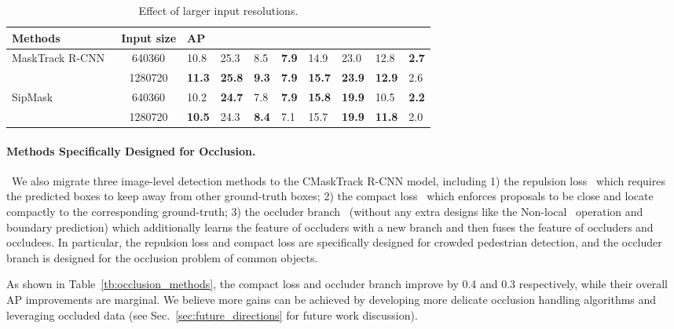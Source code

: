 \documentclass[twocolumn]{svjour3}          \smartqed  \usepackage{graphicx}
\def\myTextColor{\textcolor[rgb]{0, 0, 0}}
\begin{document}
\begin{sloppypar}
\begin{table*}
\centering
\begin{tabular}{|l|c|p{0.48cm}<{\centering}p{0.48cm}<{\centering}p{0.57cm}<{\centering}p{0.48cm}<{\centering}p{0.6cm}<{\centering}|p{0.6cm}<{\centering}p{0.6cm}<{\centering}p{0.6cm}<{\centering}|}
\hline
Methods & Input size & AP  &   &   &   &  &   &   &  \\
\hline
\hline
\multirow{2}{*}{MaskTrack R-CNN~\cite{youtube_vis}} & 640360 & 10.8 & 25.3 & 8.5 & \textbf{7.9} & 14.9 & 23.0 & 12.8 & \textbf{2.7} \\
& 1280720 & \textbf{11.3} & \textbf{25.8} & \textbf{9.3} & \textbf{7.9} & \textbf{15.7} & \textbf{23.9} & \textbf{12.9} & 2.6 \\
\hline
\hline
\multirow{2}{*}{SipMask~\cite{sipmask}} & 640360 & 10.2 & \textbf{24.7} & 7.8 & \textbf{7.9} & \textbf{15.8} & \textbf{19.9} & 10.5 & \textbf{2.2} \\
& 1280720 & \textbf{10.5} & 24.3 & \textbf{8.4} & 7.1 & 15.7 & \textbf{19.9} & \textbf{11.8} & 2.0 \\
\hline
\end{tabular}
\caption{\myTextColor{Effect of larger input resolutions.}}
\label{tb:resolution}
\end{table*}

\paragraph{\myTextColor{Methods Specifically Designed for Occlusion.}}~\myTextColor{We also migrate three image-level detection methods to the CMaskTrack R-CNN model, including 1) the repulsion loss~\cite{repulsion} which requires the predicted boxes to keep away from other ground-truth boxes; 2) the compact loss~\cite{orcnn} which enforces proposals to be close and locate compactly to the corresponding ground-truth; 3) the occluder branch~\cite{bcnet} (without any extra designs like the Non-local~\cite{nonlocal} operation and boundary prediction) which additionally learns the feature of occluders with a new branch and then fuses the feature of occluders and occludees. In particular, the repulsion loss and compact loss are specifically designed for crowded pedestrian detection, and the occluder branch is designed for the occlusion problem of common objects.}

\myTextColor{As shown in Table~\ref{tb:occlusion_methods}, the compact loss and occluder branch improve  by 0.4 and 0.3 respectively, while their overall AP improvements are marginal. We believe more gains can be achieved by developing more delicate occlusion handling algorithms and leveraging occluded data (see Sec.~\ref{sec:future_directions} for future work discussion).}



\end{sloppypar}
\end{document}
